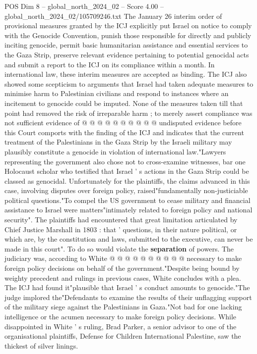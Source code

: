 \begin{textsample}{POS Dim 8 – global\_north\_2024\_02 – Score 4.00 – global\_north\_2024\_02/105709246.txt}
The January 26 interim order of provisional measures granted by the ICJ explicitly put Israel on notice to comply with the Genocide Convention, punish those responsible for directly and publicly inciting genocide, permit basic humanitarian assistance and essential services to the Gaza Strip, preserve relevant evidence pertaining to potential genocidal acts and submit a report to the ICJ on its compliance within a month.
In international law, these interim measures are accepted as binding.
The ICJ also showed some scepticism to arguments that Israel had taken adequate measures to minimise harm to Palestinian civilians and respond to instances where an incitement to genocide could be imputed.
None of the measures taken till that point had removed the risk of irreparable harm ; to merely assert compliance was not sufficient evidence of @ @ @ @ @ @ @ @ @ @ undisputed evidence before this Court comports with the finding of the ICJ and indicates that the current treatment of the Palestinians in the Gaza Strip by the Israeli military may plausibly constitute a genocide in violation of international law."Lawyers representing the government also chose not to cross-examine witnesses, bar one Holocaust scholar who testified that Israel ' s actions in the Gaza Strip could be classed as genocidal.
Unfortunately for the plaintiffs, the claims advanced in this case, involving disputes over foreign policy, raised"fundamentally non-justiciable political questions."To compel the US government to cease military and financial assistance to Israel were matters"intimately related to foreign policy and national security".
The plaintiffs had encountered that great limitation articulated by Chief Justice Marshall in 1803 : that ' questions, in their nature political, or which are, by the constitution and laws, submitted to the executive, can never be made in this court".
To do so would violate the \textbf{separation} of powers.
The judiciary was, according to White @ @ @ @ @ @ @ @ @ @ necessary to make foreign policy decisions on behalf of the government."Despite being bound by weighty precedent and rulings in previous cases, White concludes with a plea.
The ICJ had found it"plausible that Israel ' s conduct amounts to genocide."The judge implored the"Defendants to examine the results of their unflagging support of the military siege against the Palestinians in Gaza."Not bad for one lacking intelligence or the acumen necessary to make foreign policy decisions.
While disappointed in White ' s ruling, Brad Parker, a senior advisor to one of the organisational plaintiffs, Defense for Children International Palestine, saw the thickest of silver linings.

\end{textsample}
